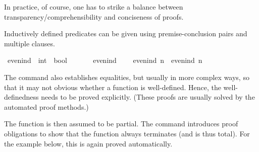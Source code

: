 \begin{isabellebody}
%
\isadelimvisible
%
\endisadelimvisible
%
\begin{isamarkuptext}%
In practice, of course, one has to strike a balance between transparency/comprehensibility and conciseness of proofs.%
\end{isamarkuptext}\isamarkuptrue%
%
\isadelimdocument
%
\endisadelimdocument
%
\isatagdocument
%
\isamarkuptrue%
%
\endisatagdocument
{\isafolddocument}%
%
\isadelimdocument
%
\endisadelimdocument
%
\begin{isamarkuptext}%
Inductively defined predicates can be given using premise-conclusion pairs and multiple clauses.%
\end{isamarkuptext}\isamarkuptrue%
\isamarkupfalse%
\ even{\isacharunderscore}{\kern0pt}ind\ {\isacharcolon}{\kern0pt}{\isacharcolon}{\kern0pt}\ {\isacartoucheopen}int\ {\isasymRightarrow}\ bool{\isacartoucheclose}\isanewline
\ \ \isanewline
\ \ \ \ {\isacartoucheopen}even{\isacharunderscore}{\kern0pt}ind\ {}{\isacartoucheclose}\isanewline
\ \ {\isacharbar}{\kern0pt}\ {\isacartoucheopen}even{\isacharunderscore}{\kern0pt}ind\ n\ {\isasymLongrightarrow}\ even{\isacharunderscore}{\kern0pt}ind\ {\isacharparenleft}{\kern0pt}n{\isacharplus}{\kern0pt}{}{\isacharparenright}{\kern0pt}{\isacartoucheclose}%
\isadelimdocument
%
\endisadelimdocument
%
\isatagdocument
%
\isamarkuptrue%
%
\endisatagdocument
{\isafolddocument}%
%
\isadelimdocument
%
\endisadelimdocument
%
\begin{isamarkuptext}%
The command  also establishes equalities, but usually in more complex ways, so that it may not obvious whether a function is well-defined. Hence, the well-definedness needs to be proved explicitly. (These proofs are usually solved by the automated proof methods.)

The function is then assumed to be partial. The command  introduces proof obligations to show that the function always terminates (and is thus total). For the example below, this is again proved automatically.


\end{isamarkuptext}
\end{isabellebody}
